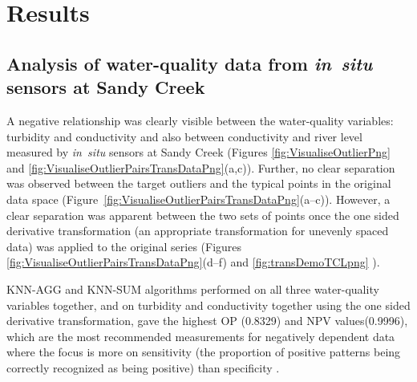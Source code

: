 \documentclass[draft]{agujournal2018} %
\begin{document}
\section{Results}\label{sec:application}

\subsection{Analysis of water-quality data from
\emph{in~situ} sensors at Sandy
Creek}\label{sec:analysis-of-water-quality-data-from-in-situ-sensors-at-sandy-creek}

A negative relationship was clearly visible between the water-quality
variables: turbidity and
conductivity and also between conductivity and river level measured by
\emph{in~situ} sensors at Sandy Creek (Figures \ref{fig:VisualiseOutlierPng} and
\ref{fig:VisualiseOutlierPairsTransDataPng}(a,c)). Further, no clear
separation was observed between the target outliers and the typical
points in the original data space
(Figure~\ref{fig:VisualiseOutlierPairsTransDataPng}(a--c)). However, a
clear separation was apparent between the two sets of points once the
one sided derivative transformation (an appropriate transformation for
unevenly spaced data) was applied to the original series
(Figures~
\ref{fig:VisualiseOutlierPairsTransDataPng}(d--f) and \ref{fig:transDemoTCLpng} ).

KNN-AGG and KNN-SUM algorithms performed on all three water-quality
variables together, and on turbidity and conductivity together using the
one sided derivative transformation, gave the highest OP (0.8329)
and NPV values(0.9996), which are the most recommended
measurements for negatively dependent data  where the focus is more on sensitivity (the proportion of positive
patterns being correctly recognized as being positive) than specificity
\citep{ranawana2006optimized}.
\end{document}
